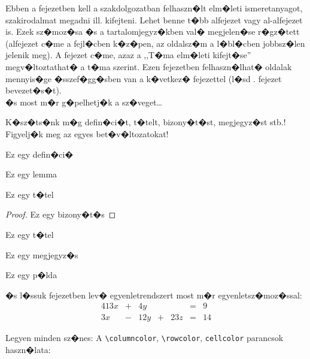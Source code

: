 \label{Chap:tema}

\iffalse
Ebben a fejezetben kell a szakdolgozatban felhaszn�lt elm�leti ismeretanyagot, szakirodalmat megadni ill. kifejteni. Lehet benne t�bb alfejezet vagy al-alfejezet is. Ezek sz�moz�sa �s a tartalomjegyz�kben val� megjelen�se r�gz�tett (alfejezet c�me a fejl�cben k�z�pen, az oldalsz�m a l�bl�cben jobbsz�len jelenik meg). A fejezet c�me, azaz a ,,T�ma elm�leti kifejt�se'' megv�ltoztathat� a t�ma szerint. Ezen fejezetben felhaszn�lhat� oldalak mennyis�ge �sszef�gg�sben van a k�vetkez� fejezettel (l�sd . fejezet bevezet�s�t).\\

�s most m�r g�pelhetj�k a sz�veget\ldots

K�sz�ts�nk m�g defin�ci�t, t�telt, bizony�t�st, megjegyz�st stb.! Figyelj�k meg az egyes bet�v�ltozatokat!
\begin{definition}
Ez egy defin�ci�
\end{definition}

\begin{lemma}
Ez egy lemma
\end{lemma}

\begin{theorem}
Ez egy t�tel
\end{theorem}

\begin{proof}
Ez egy bizony�t�s
\end{proof}

\begin{corollary}
Ez egy t�tel
\end{corollary}

\begin{remark}
Ez egy megjegyz�s
\end{remark}

\begin{example}
Ez egy p�lda
\end{example}
�s l�ssuk  fejezetben lev� egyenletrendszert most m�r egyenletsz�moz�ssal:
\begin{alignat}{4}
  13x &+{} &  4y &    &     & ={} & 9\\
   3x &-{} & 12y &+{} & 23z & ={} &14
\end{alignat}


Legyen minden sz�nes: A \verb|\columncolor|, \verb|\rowcolor|,
\verb|cellcolor| parancsok haszn�lata:

